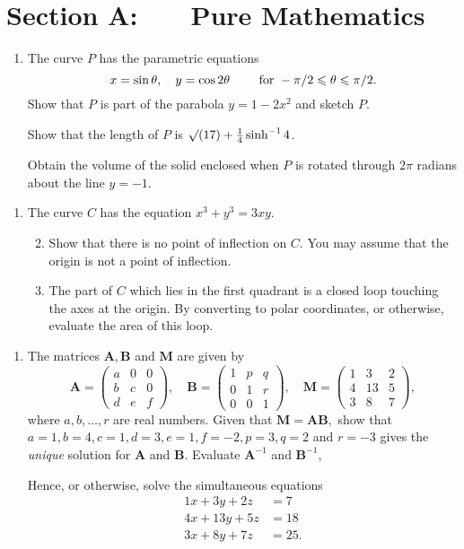 \documentclass[a4, 11pt]{report}
\newlength{\qspace}
\newcounter{qnumber}
\newenvironment{question}%
 {\vspace{\qspace}
  \begin{enumerate}[\bfseries 1\quad][10]%
    \setcounter{enumi}{\value{qnumber}}%
    \item%
 }
{
  \end{enumerate}
  \filbreak
  \stepcounter{qnumber}
 }
\newenvironment{questionparts}[1][1]%
 {
  \begin{enumerate}[\bfseries (i)]%
    \setcounter{enumii}{#1}
    \addtocounter{enumii}{-1}
    \setlength{\itemsep}{5mm}
    \setlength{\parskip}{8pt}
 }
 {
  \end{enumerate}
 }
\def\le{\leqslant}
\begin{document}
\setcounter{page}{2}

 
\section*{Section A: \ \ \ Pure Mathematics}

\begin{question}
The   curve $P$ has the parametric equations
$$
x= \sin\theta, \quad y=\cos2\theta
\qquad\hbox{ for }-\pi/2 \le \theta \le \pi/2.
$$
Show that $P$ is part of the parabola $y=1-2x^2$ and sketch $P$.

Show that the length of $P$ is $\surd (17) + {1\over 4} \sinh^{-1}4$.

Obtain the volume of the solid enclosed when  $P$ 
is rotated through $2\pi$ radians about the line $y=-1$.

\end{question}

\begin{question}
The curve $C$ has the equation $x^3+y^3 = 3xy$.
\begin{questionparts}
\item Show that there is no point of inflection on $C$. You may assume that
the origin is not a point of inflection.

\item The part of $C$ which lies in the first quadrant is a closed loop
touching the axes at the origin. By converting to polar coordinates,
or otherwise, evaluate the area of this loop. 
\end{questionparts}
\end{question}

\begin{question}
The matrices $\mathbf{A},\mathbf{B}$ and $\mathbf{M}$ are given
by 
\[
\mathbf{A}=\begin{pmatrix}a & 0 & 0\\
b & c & 0\\
d & e & f
\end{pmatrix},\quad\mathbf{B}=\begin{pmatrix}1 & p & q\\
0 & 1 & r\\
0 & 0 & 1
\end{pmatrix},\quad\mathbf{M}=\begin{pmatrix}1 & 3 & 2\\
4 & 13 & 5\\
3 & 8 & 7
\end{pmatrix},
\]
where $a,b,\ldots,r$ are real numbers. Given that $\mathbf{M=AB},$
show that $a=1,b=4,c=1,d=3,e=1,f=-2,p=3,q=2$ and $r=-3$ gives the
\textit{unique }solution for $\mathbf{A}$ and $\mathbf{B}.$ Evaluate
$\mathbf{A}^{-1}$ and $\mathbf{B}^{-1},$


Hence, or otherwise, solve the simultaneous equations 
\begin{alignat*}{1}
x+3y+2z & =7\\
4x+13y+5z & =18\\
3x+8y+7z & =25.
\end{alignat*}
\end{question}
\end{document}
